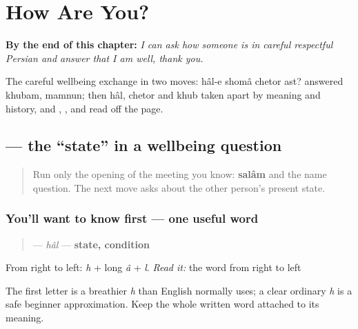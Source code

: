
\chapter{How Are You?}
\label{ch:fa-how-are-you}

\begin{chapteropening}
\textbf{By the end of this chapter:} \emph{I can ask how someone is in careful respectful Persian and answer that I am well, thank you.}

The careful wellbeing exchange in two moves: hâl-e shomâ chetor ast? answered khubam, mamnun; then hâl, chetor and khub taken apart by meaning and history, and , ,  and  read off the page.
\end{chapteropening}

\section[\texorpdfstring{\fa{حال} (hâl)}{حال (hâl)}]{ — the “state” in a wellbeing question}

\label{lesson:FA-C04-hal}



\begin{quote}
Run only the opening of the meeting you know: \textbf{salâm} and the name question. The next move asks about the other person's present state.
\end{quote}

\subsection*{You'll want to know first — one useful word}
\begin{quote}
\textbf{} — \emph{hâl} — \textbf{state, condition}
\end{quote}

From right to left: \textbf{} \emph{h} + \textbf{} long \emph{â} + \textbf{} \emph{l}. \emph{Read it:} the word from right to left

The first letter is a breathier \emph{h} than English normally uses; a clear ordinary \emph{h} is a safe beginner approximation. Keep the whole written word attached to its meaning.

